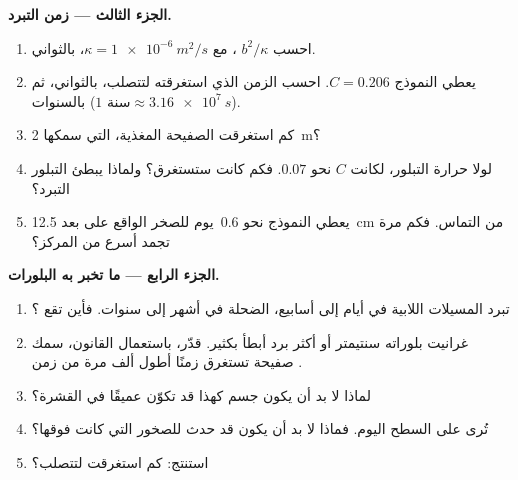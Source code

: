 \begin{problem}
\medskip
\noindent\textbf{الجزء الثالث --- زمن التبرد.}
\begin{enumerate}[resume]
  \item احسب $b^2/\kappa$ ، مع $\kappa = \qty{1e-6}{m^2/s}$،
        بالثواني.
  \item يعطي النموذج $C = 0.206$. احسب الزمن الذي استغرقته  لتتصلب،
        بالثواني، ثم بالسنوات ($\num{1}\text{ سنة} \approx \qty{3.16e7}{s}$).
  \item كم استغرقت الصفيحة المغذية، التي سمكها \qty{2}{m}؟
  \item لولا حرارة التبلور، لكانت $C$ نحو $0.07$.
        فكم كانت  ستستغرق؟ ولماذا يبطئ التبلور
        التبرد؟
  \item يعطي النموذج نحو \num{0.6}~يوم للصخر الواقع على بعد \qty{12.5}{cm}
        من التماس. فكم مرة تجمد أسرع من
        المركز؟
\end{enumerate}

\medskip
\noindent\textbf{الجزء الرابع --- ما تخبر به البلورات.}
\begin{enumerate}[resume]
  \item تبرد المسيلات اللابية في أيام إلى أسابيع،  الضحلة في أشهر إلى
        سنوات. فأين تقع ؟
  \item غرانيت بلوراته سنتيمتر أو أكثر برد أبطأ بكثير.
        قدّر، باستعمال القانون، سمك صفيحة
        تستغرق زمنًا أطول ألف مرة من زمن .
  \item لماذا لا بد أن يكون جسم كهذا قد تكوّن عميقًا في القشرة؟
  \item تُرى  على السطح اليوم. فماذا لا بد أن يكون قد حدث
        للصخور التي كانت فوقها؟
  \item استنتج: كم استغرقت  لتتصلب؟
\end{enumerate}
\end{problem}
